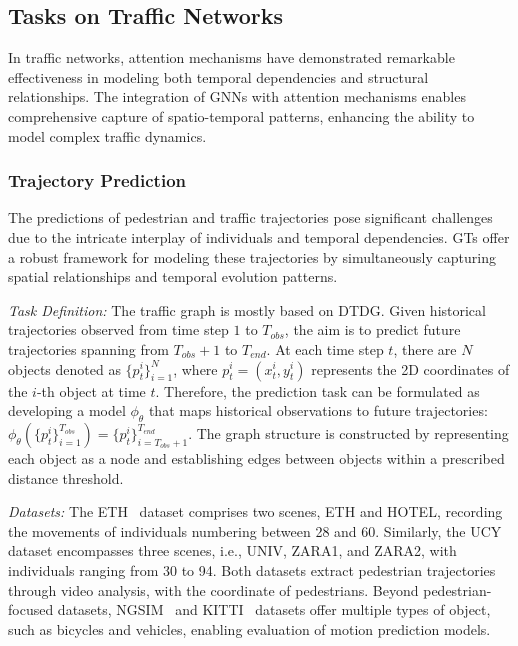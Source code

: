 \subsection{Tasks on Traffic Networks}
\label{sec:application-traffic}
In traffic networks, attention mechanisms have demonstrated remarkable effectiveness in modeling both temporal dependencies and structural relationships. The integration of GNNs with attention mechanisms enables comprehensive capture of spatio-temporal patterns, enhancing the ability to model complex traffic dynamics.

\subsubsection{\textbf{Trajectory Prediction}}
The predictions of pedestrian and traffic trajectories pose significant challenges due to the intricate interplay of individuals and temporal dependencies. GTs offer a robust framework for modeling these trajectories by simultaneously capturing spatial relationships and temporal evolution patterns. 

\textit{Task Definition:}
The traffic graph is mostly based on DTDG. Given historical trajectories observed from time step $1$ to $T_{obs}$, the aim is to predict future trajectories spanning from $T_{obs} + 1$ to $T_{end}$. At each time step $t$, there are $N$ objects denoted as $\{p_{t}^{i}\}_{i=1}^{N}$, where $p_{t}^{i} = (x_{t}^{i}, y_{t}^{i})$ represents the 2D coordinates of the $i$-th object at time $t$. Therefore, the prediction task can be formulated as developing a model $\phi_\theta$ that maps historical observations to future trajectories: $\phi_\theta(\{p_{t}^{i}\}_{i=1}^{T_{obs}}) = \{p_{t}^{i}\}_{i=T_{obs}+1}^{T_{end}}$. 
The graph structure is constructed by representing each object as a node and establishing edges between objects within a prescribed distance threshold.


\textit{Datasets:} The ETH~\cite{pellegrini2009you} dataset comprises two scenes, ETH and HOTEL, recording the movements of individuals numbering between 28 and 60. Similarly, the UCY~\cite{lerner2007crowds} dataset encompasses three scenes, i.e., UNIV, ZARA1, and ZARA2, with individuals ranging from 30 to 94. 
Both datasets extract pedestrian trajectories through video analysis, with the coordinate of pedestrians. 
Beyond pedestrian-focused datasets, NGSIM~\cite{simulation2007us} and KITTI~\cite{geiger2013vision} datasets offer multiple types of object, such as bicycles and vehicles, enabling evaluation of motion prediction models.

